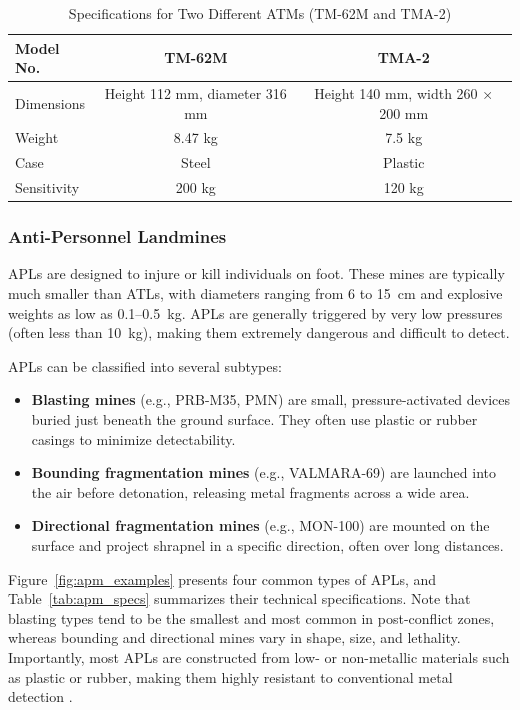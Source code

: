 \begin{table}[h]
    \centering
    \caption{Specifications for Two Different ATMs (TM-62M and TMA-2) \cite{paik2002image}}
    \label{tab:atm_specs}
    \begin{tabular}{lcc}
        \toprule
        \textbf{Model No.} & \textbf{TM-62M} & \textbf{TMA-2} \\
        \midrule
        Dimensions & Height 112 mm, diameter 316 mm & Height 140 mm, width 260 × 200 mm \\
        Weight & 8.47 kg & 7.5 kg \\
        Case & Steel & Plastic \\
        Sensitivity & 200 kg & 120 kg \\
        \bottomrule
    \end{tabular}
\end{table}

\subsubsection{Anti-Personnel Landmines}

APLs are designed to injure or kill individuals on foot. These mines are typically much smaller than ATLs, with diameters ranging from 6 to 15~cm and explosive weights as low as 0.1–0.5~kg. APLs are generally triggered by very low pressures (often less than 10~kg), making them extremely dangerous and difficult to detect.

APLs can be classified into several subtypes:
\begin{itemize}
    \item \textbf{Blasting mines} (e.g., PRB-M35, PMN) are small, pressure-activated devices buried just beneath the ground surface. They often use plastic or rubber casings to minimize detectability.
    \item \textbf{Bounding fragmentation mines} (e.g., VALMARA-69) are launched into the air before detonation, releasing metal fragments across a wide area.
    \item \textbf{Directional fragmentation mines} (e.g., MON-100) are mounted on the surface and project shrapnel in a specific direction, often over long distances.
\end{itemize}

Figure~\ref{fig:apm_examples} presents four common types of APLs, and Table~\ref{tab:apm_specs} summarizes their technical specifications. Note that blasting types tend to be the smallest and most common in post-conflict zones, whereas bounding and directional mines vary in shape, size, and lethality. Importantly, most APLs are constructed from low- or non-metallic materials such as plastic or rubber, making them highly resistant to conventional metal detection \cite{kaya2017buried}.

